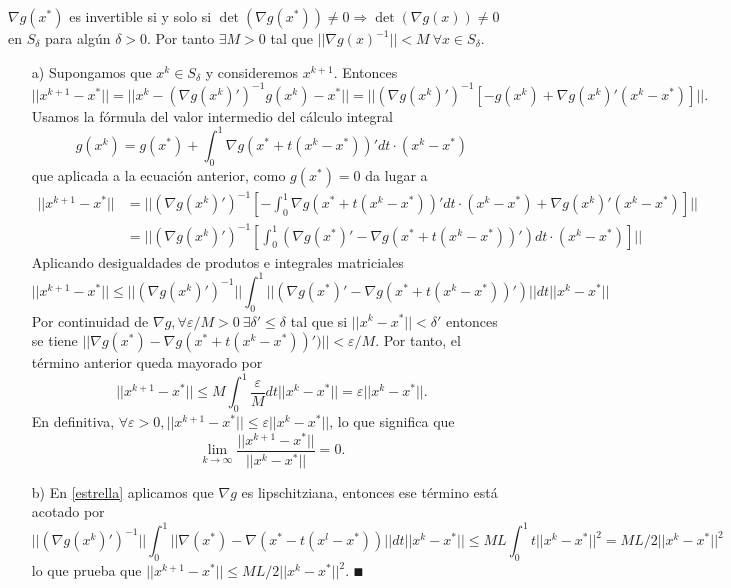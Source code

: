 \documentclass[MIOP.tex]{subfiles}
\begin{document}
\begin{dem}
$\nabla g(x^*)$ es invertible si y solo si $\det(\nabla g(x^*))\neq 0\Rightarrow\det(\nabla g(x))\neq 0$ en $S_\delta$ para algún $\delta>0$. Por tanto $\exists M>0$ tal que $||\nabla g(x)^{-1}||<M\ \forall x\in S_\delta$. 
\begin{itemize}
\item[a)] Supongamos que $x^k\in S_\delta$ y consideremos $x^{k+1}$. Entonces
$$||x^{k+1}-x^*||=||x^k-(\nabla g(x^k)')^{-1}g(x^k)-x^*||=||(\nabla g(x^k)')^{-1}[-g(x^k)+\nabla g(x^k)'(x^k-x^*)]||.$$
Usamos la fórmula del valor intermedio del cálculo integral
$$g(x^k)=g(x^*)+\int_0^1\nabla g(x^*+t(x^k-x^*))'dt\cdot(x^k-x^*)$$
que aplicada a la ecuación anterior, como $g(x^*)=0$  da lugar a
\begin{align*}
||x^{k+1}-x^*||&=||(\nabla g(x^k)')^{-1}\left[-\int_0^1\nabla g(x^*+t(x^k-x^*))'dt\cdot(x^k-x^*)+\nabla g(x^k)'(x^k-x^*)\right]||\\
&=||(\nabla g(x^k)')^{-1}\left[\int_0^1(\nabla g(x^*)'-\nabla g(x^*+t(x^k-x^*))')dt\cdot(x^k-x^*)\right]||
\end{align*}
Aplicando desigualdades de produtos e integrales matriciales
\begin{equation}\label{estrella}
||x^{k+1}-x^*||\leq||(\nabla g(x^k)')^{-1}||\int_0^1||(\nabla g(x^*)'-\nabla g(x^*+t(x^k-x^*))')||dt||x^k-x^*||
\end{equation}
Por continuidad de $\nabla g, \forall\varepsilon/M>0\ \exists\delta'\leq\delta$ tal que si $||x^k-x^*||<\delta'$ entonces se tiene $ ||\nabla g(x^*)-\nabla g(x^*+t(x^k-x^*))')||<\varepsilon/M$. Por tanto, el término anterior queda mayorado por
$$||x^{k+1}-x^*|| \leq M\int_0^1\frac{\varepsilon}{M} dt ||x^k-x^*||=\varepsilon ||x^k-x^*||.$$
En definitiva, $\forall\varepsilon>0, ||x^{k+1}-x^*||\leq\varepsilon||x^k-x^*||$, lo que significa que $$\lim_{k\to\infty}\frac{||x^{k+1}-x^*||}{||x^k-x^*||}=0.$$
\item[b)] En \ref{estrella} aplicamos que $\nabla g$ es lipschitziana, entonces ese término está acotado por
$$||(\nabla g(x^k)')^{-1}||\int_0^1||\nabla(x^*)-\nabla(x^*-t(x^l-x^*))||dt||x^k-x^*||\leq ML\int_0^1 t||x^k-x^*||^2=ML/2||x^k-x^*||^2$$
lo que prueba que $ ||x^{k+1}-x^*||\leq ML/2||x^k-x^*||^2$. $\QED$
\end{itemize}
\end{dem}
\end{document}
